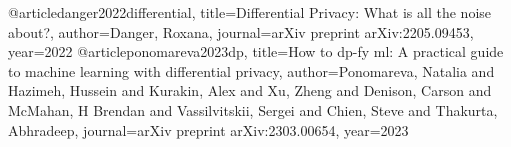 @article{danger2022differential,
  title={Differential Privacy: What is all the noise about?},
  author={Danger, Roxana},
  journal={arXiv preprint arXiv:2205.09453},
  year={2022}
}
@article{ponomareva2023dp,
  title={How to dp-fy ml: A practical guide to machine learning with differential privacy},
  author={Ponomareva, Natalia and Hazimeh, Hussein and Kurakin, Alex and Xu, Zheng and Denison, Carson and McMahan, H Brendan and Vassilvitskii, Sergei and Chien, Steve and Thakurta, Abhradeep},
  journal={arXiv preprint arXiv:2303.00654},
  year={2023}
}

